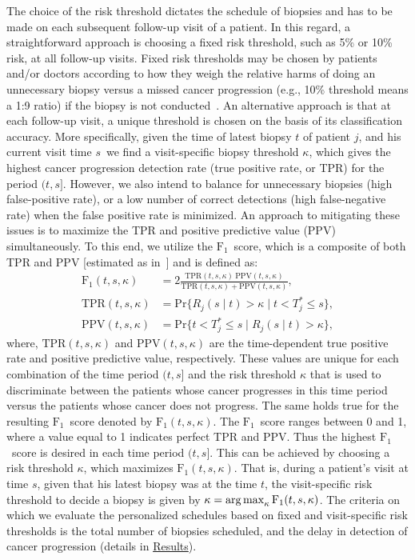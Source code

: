 The choice of the risk threshold dictates the schedule of biopsies and has to be made on each subsequent follow-up visit of a patient. In this regard, a straightforward approach is choosing a fixed risk threshold, such as 5\% or 10\% risk, at all follow-up visits. Fixed risk thresholds may be chosen by patients and/or doctors according to how they weigh the relative harms of doing an unnecessary biopsy versus a missed cancer progression (e.g., 10\% threshold means a 1:9 ratio) if the biopsy is not conducted~\citep{vickers2006decision}. An alternative approach is that at each follow-up visit, a unique threshold is chosen on the basis of its classification accuracy. More specifically, given the time of latest biopsy $t$ of patient $j$, and his current visit time $s$\, we find a visit-specific biopsy threshold $\kappa$, which gives the highest cancer progression detection rate (true positive rate, or TPR) for the period $(t, s]$. However, we also intend to balance for unnecessary biopsies (high false-positive rate), or a low number of correct detections (high false-negative rate) when the false positive rate is minimized. An approach to mitigating these issues is to maximize the TPR and positive predictive value (PPV) simultaneously. To this end, we utilize the $\mbox{F}_1$~score, which is a composite of both TPR and PPV [estimated as in~\citet{landmarking2017}] and is defined as: 
\begin{equation}
\label{c3:eq:F1_TPR_PPV}
\begin{split}
\mbox{F}_1(t,  s, \kappa) &= 2\frac{\mbox{TPR}(t,  s, \kappa)\ \mbox{PPV}(t,  s, \kappa)}{\mbox{TPR}(t,  s, \kappa) + \mbox{PPV}(t,  s, \kappa)},\\
\mbox{TPR}(t,  s, \kappa) &= \mbox{Pr}\big\{R_j(s \mid t) > \kappa \mid t < T^*_j \leq s\big\},\\
\mbox{PPV}(t,  s, \kappa) &= \mbox{Pr}\big\{t < T^*_j \leq s \mid R_j(s \mid t) > \kappa \big\},
\end{split}
\end{equation}
where, $\mbox{TPR}(t,  s, \kappa)$ and $\mbox{PPV}(t,  s, \kappa)$ are the time-dependent true positive rate and positive predictive value, respectively. These values are unique for each combination of the time period $(t, s]$ and the risk threshold $\kappa$ that is used to discriminate between the patients whose cancer progresses in this time period versus the patients whose cancer does not progress. The same holds true for the resulting $\mbox{F}_1$~score denoted by $\mbox{F}_1(t,  s, \kappa)$. The $\mbox{F}_1$~score ranges between 0 and 1, where a value equal to 1 indicates perfect TPR and PPV. Thus the highest $\mbox{F}_1$~score is desired in each time period $(t, s]$. This can be achieved by choosing a risk threshold $\kappa$, which maximizes $\mbox{F}_1(t, s, \kappa)$. That is, during a patient's visit at time $s$, given that his latest biopsy was at the time $t$, the visit-specific risk threshold to decide a biopsy is given by ${\kappa=\operatorname{arg\,max}_{\kappa} \mbox{F}_1(t, s, \kappa)}$. The criteria on which we evaluate the personalized schedules based on fixed and visit-specific risk thresholds is the total number of biopsies scheduled, and the delay in detection of cancer progression (details in \hyperref[sec:results]{Results}). 

